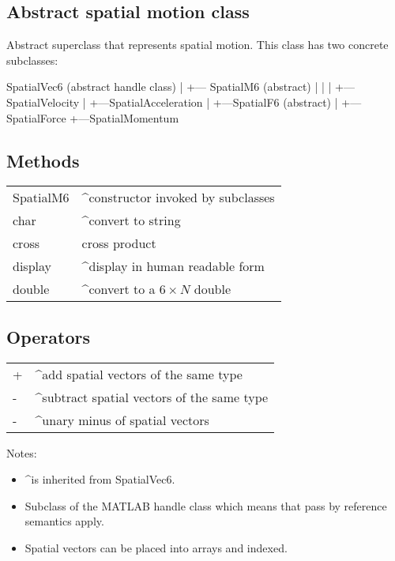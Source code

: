 \subsection*{Abstract spatial motion class}


Abstract superclass that represents spatial motion.  This class has two
concrete subclasses:

\begin{Code}
    SpatialVec6 (abstract handle class)
      |
      +--- SpatialM6 (abstract)
      |     |
      |     +---SpatialVelocity
      |     +---SpatialAcceleration
      |
      +---SpatialF6 (abstract)
           |
           +---SpatialForce
           +---SpatialMomentum

\end{Code}

\subsection*{Methods}
\begin{longtable}{lp{120mm}}
SpatialM6 & \textasciicircum constructor invoked by subclasses\\ 
char & \textasciicircum convert to string\\ 
cross & cross product\\ 
display & \textasciicircum display in human readable form\\ 
double & \textasciicircum convert to a $6 \times N$ double\\ 
\end{longtable}\vspace{1ex}

\subsection*{Operators}
\begin{longtable}{lp{120mm}}
+ & \textasciicircum add spatial vectors of the same type\\ 
- & \textasciicircum subtract spatial vectors of the same type\\ 
- & \textasciicircum unary minus of spatial vectors\\ 
\end{longtable}\vspace{1ex}


Notes:

\begin{itemize}
  \item \textasciicircum  is inherited from SpatialVec6.
  \item Subclass of the MATLAB handle class which means that pass by reference semantics     apply.
  \item Spatial vectors can be placed into arrays and indexed.
\end{itemize}

